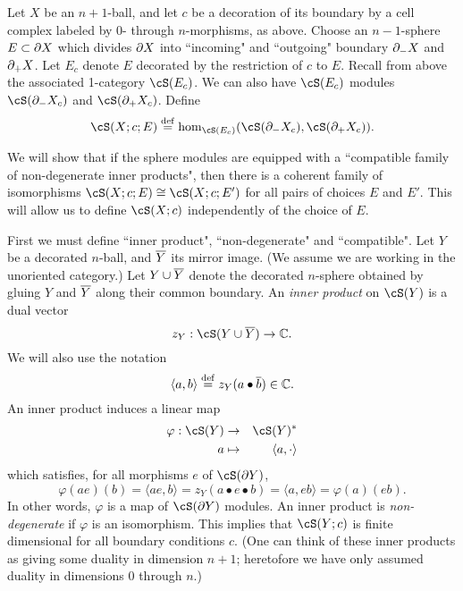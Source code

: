 Let $X$ be an $n{+}1$-ball, and let $c$ be a decoration of its boundary
by a cell complex labeled by 0- through $n$-morphisms, as above.
Choose an $n{-}1$-sphere $E\subset \partial X$ which divides
$\partial X$ into ``incoming" and ``outgoing" boundary $\partial_-X$ and $\partial_+X$.
Let $E_c$ denote $E$ decorated by the restriction of $c$ to $E$.
Recall from above the associated 1-category $\cS(E_c)$.
We can also have $\cS(E_c)$ modules $\cS(\bd_-X_c)$ and $\cS(\bd_+X_c)$.
Define
\[
	\cS(X; c; E) \deq \hom_{\cS(E_c)}(\cS(\bd_-X_c), \cS(\bd_+X_c)) .
\]

We will show that if the sphere modules are equipped with a ``compatible family of 
non-degenerate inner products", then there is a coherent family of isomorphisms
$\cS(X; c; E) \cong \cS(X; c; E')$ for all pairs of choices $E$ and $E'$.
This will allow us to define $\cS(X; c)$ independently of the choice of $E$.

First we must define ``inner product", ``non-degenerate" and ``compatible".
Let $Y$ be a decorated $n$-ball, and $\overline{Y}$ its mirror image.
(We assume we are working in the unoriented category.)
Let $Y\cup\overline{Y}$ denote the decorated $n$-sphere obtained by gluing $Y$ and $\overline{Y}$
along their common boundary.
An {\it inner product} on $\cS(Y)$ is a dual vector
\[
	z_Y : \cS(Y\cup\ol{Y}) \to \c.
\]
We will also use the notation
\[
	\langle a, b\rangle \stackrel{\mathrm{def}}{=} z_Y(a\bullet \overline{b}) \in \mathbb{C} .
\]
An inner product induces a linear map
\begin{eqnarray*}
	\varphi: \cS(Y) &\to& \cS(Y)^* \\
	a &\mapsto& \langle a, \cdot \rangle
\end{eqnarray*}
which satisfies, for all morphisms $e$ of $\cS(\bd Y)$,
\[
	\varphi(ae)(b) = \langle ae, b \rangle = z_Y(a\bullet e\bullet b) = 
			\langle a, eb \rangle = \varphi(a)(eb) .
\]
In other words, $\varphi$ is a map of $\cS(\bd Y)$ modules.
An inner product is {\it non-degenerate} if $\varphi$ is an isomorphism.
This implies that $\cS(Y; c)$ is finite dimensional for all boundary conditions $c$.
(One can think of these inner products as giving some duality in dimension $n{+}1$;
heretofore we have only assumed duality in dimensions 0 through $n$.)

